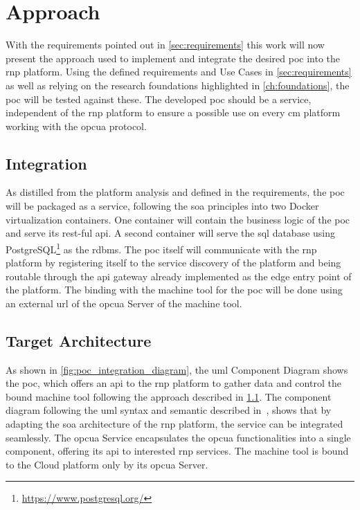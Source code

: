 \documentclass[
a4paper,
twoside,
headsepline,
cleardoublepage=empty,
parskip=half,
draft=false
]{scrbook}
\begin{document}
		\section{Approach} \label{sec:approach}

			With the requirements pointed out in \cref{sec:requirements} this work will now present the approach used to implement and integrate the desired \gls{poc} into the \gls{rnp} platform. Using the defined requirements and Use Cases in \cref{sec:requirements} as well as relying on the research foundations highlighted in \cref{ch:foundations}, the \gls{poc} will be tested against these. The developed \gls{poc} should be a service, independent of the \gls{rnp} platform to ensure a possible use on every \gls{cm} platform working with the \gls{opcua} protocol.

			\subsection{Integration} \label{subsec:integration}

				As distilled from the platform analysis and defined in the requirements, the \gls{poc} will be packaged as a service, following the \gls{soa} principles into two Docker virtualization containers. One container will contain the business logic of the \gls{poc} and serve its \gls{rest}-ful \gls{api}. A second container will serve the \gls{sql} database using PostgreSQL\footnote{\url{https://www.postgresql.org/}} as the \gls{rdbms}.
				The \gls{poc} itself will communicate with the \gls{rnp} platform by registering itself to the service discovery of the platform and being routable through the \gls{api} gateway already implemented as the edge entry point of the platform.
				The binding with the machine tool for the \gls{poc} will be done using an external \gls{url} of the \gls{opcua} Server of the machine tool.

			\subsection{Target Architecture} \label{subsec:target_architecture}

				As shown in \cref{fig:poc_integration_diagram}, the \gls{uml} Component Diagram shows the \gls{poc}, which offers an \gls{api} to the \gls{rnp} platform to gather data and control the bound machine tool following the approach described in \cref{subsec:integration}. The component diagram following the \gls{uml} syntax and semantic described in~\cite{uml2017}, shows that by adapting the \gls{soa} architecture of the \gls{rnp} platform, the service can be integrated
				seamlessly. 
				The \gls{opcua} Service encapsulates the \gls{opcua} functionalities into a single component, offering its \gls{api} to interested \gls{rnp} services. 
				The machine tool is bound to the Cloud platform only by its \gls{opcua} Server.
\end{document}
